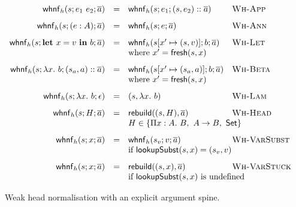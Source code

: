 \begin{figure}[tbp]
\[
\begin{array}{rcll}
\mathsf{whnf}_h(s; e_1\ e_2; \overline{a})
&=&
\mathsf{whnf}_h(s; e_1; (s,e_2) :: \overline{a})
& \textsc{Wh-App}
\\[0.8em]

\mathsf{whnf}_h(s; (e : A); \overline{a})
&=&
\mathsf{whnf}_h(s; e; \overline{a})
& \textsc{Wh-Ann}
\\[0.8em]

\mathsf{whnf}_h(s; \mathbf{let}\ x = v\ \mathbf{in}\ b; \overline{a})
&=&
\mathsf{whnf}_h(s[x' \mapsto (s,v)]; b; \overline{a})
& \textsc{Wh-Let}
\\
&&
\multicolumn{2}{l}{\text{where } x' = \mathsf{fresh}(s,x)}
\\[0.8em]

\mathsf{whnf}_h(s; \lambda x.\ b; (s_a,a) :: \overline{a})
&=&
\mathsf{whnf}_h(s[x' \mapsto (s_a,a)]; b; \overline{a})
& \textsc{Wh-Beta}
\\
&&
\multicolumn{2}{l}{\text{where } x' = \mathsf{fresh}(s,x)}
\\[0.8em]

\mathsf{whnf}_h(s; \lambda x.\ b; \epsilon)
&=&
(s,\lambda x.\ b)
& \textsc{Wh-Lam}
\\[0.8em]

\mathsf{whnf}_h(s; H; \overline{a})
&=&
\mathsf{rebuild}((s,H), \overline{a})
& \textsc{Wh-Head}
\\
&&
\multicolumn{2}{l}{
H \in
\{
\Pi x : A.\ B,\ A \to B,\ \mathsf{Set}
\}}
\\[0.8em]

\mathsf{whnf}_h(s; x; \overline{a})
&=&
\mathsf{whnf}_h(s_v; v; \overline{a})
& \textsc{Wh-VarSubst}
\\
&&
\multicolumn{2}{l}{
\text{if } \mathsf{lookupSubst}(s,x) = (s_v,v)}
\\[0.8em]

\mathsf{whnf}_h(s; x; \overline{a})
&=&
\mathsf{rebuild}((s,x), \overline{a})
& \textsc{Wh-VarStuck}
\\
&&
\multicolumn{2}{l}{
\text{if } \mathsf{lookupSubst}(s,x) \text{ is undefined}}
\end{array}
\]
\caption{Weak head normalisation with an explicit argument spine.}
\label{fig:whnf}
\end{figure}

